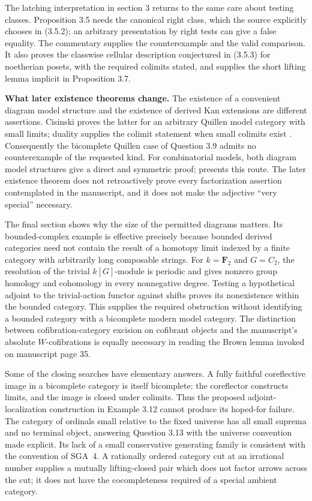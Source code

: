 The latching interpretation in section 3 returns to the same care about
testing classes. Proposition 3.5 needs the canonical right class, which the
source explicitly chooses in (3.5.2); an arbitrary presentation by right
tests can give a false equality. The commentary supplies the counterexample
and the valid comparison. It also proves the classwise cellular description
conjectured in (3.5.3) for noetherian posets, with the required colimits stated,
and supplies the short lifting lemma implicit in Proposition 3.7.

\noindent\textbf{What later existence theorems change.}
The existence of a convenient diagram model structure and the existence of
derived Kan extensions are different assertions. Cisinski proves the latter
for an arbitrary Quillen model category with small limits; duality supplies
the colimit statement when small colimits exist
\citep[Theorem 6.11]{Cisinski2003}. Consequently the bicomplete Quillen
case of Question 3.9 admits no counterexample of the requested kind.
For combinatorial models, both diagram model structures give a direct and
symmetric proof; \citet[Theorem 1.28 and Proposition 1.30]{Groth2013} presents
this route. The later existence theorem does not retroactively prove every
factorization assertion contemplated in the manuscript, and it does not
make the adjective ``very special'' necessary.

The final section shows why the size of the permitted diagrams matters.
Its bounded-complex example is effective precisely because bounded derived
categories need not contain the result of a homotopy limit indexed by a
finite category with arbitrarily long composable strings. For
$k=\mathbf F_2$ and $G=C_2$, the resolution of the trivial $k[G]$-module is
periodic and gives nonzero group homology and cohomology in every
nonnegative degree. Testing a hypothetical adjoint to the trivial-action
functor against shifts proves its nonexistence within the bounded category.
This supplies the required obstruction without identifying a bounded
category with a bicomplete modern model category. The distinction between
cofibration-category excision on cofibrant objects and the manuscript's
absolute $W$-cofibrations is equally necessary in reading the Brown lemma
invoked on manuscript page 35.

Some of the closing searches have elementary answers. A fully faithful
coreflective image in a bicomplete category is itself bicomplete: the
coreflector constructs limits, and the image is closed under colimits.
Thus the proposed adjoint-localization construction in Example 3.12 cannot
produce its hoped-for failure. The category of ordinals small relative to
the fixed universe has all small suprema and no terminal object, answering
Question 3.13 with the universe convention made explicit. Its lack of a
small conservative generating family is consistent with the convention of
SGA~4. A rationally ordered category cut at an irrational number supplies
a mutually lifting-closed pair which does not factor arrows across the cut;
it does not have the cocompleteness required of a special ambient category.

